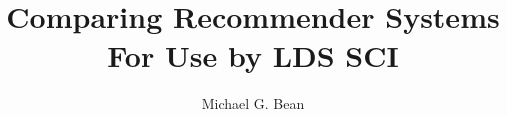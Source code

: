 \documentclass[12pt]{report}
\begin{document}
\title{Comparing Recommender Systems For Use by LDS SCI}
\author{Michael G. Bean}

\showBYUHeader




















\end{document}
